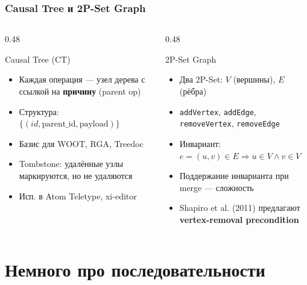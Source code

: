 \documentclass{beamer}
\begin{document}
\begin{frame}
\frametitle{Causal Tree и 2P-Set Graph}

\begin{columns}
\begin{column}{0.48\textwidth}
\begin{block}{Causal Tree (CT)}
\begin{itemize}
  \item Каждая операция — узел дерева с ссылкой на \textbf{причину} (parent op)
  \item Структура: $\{(id, \text{parent\_id}, \text{payload})\}$
  \item Базис для WOOT, RGA, Treedoc
  \item Tombstone: удалённые узлы маркируются, но не удаляются
  \item Исп. в Atom Teletype, xi-editor
\end{itemize}
\end{block}
\end{column}
\begin{column}{0.48\textwidth}
\begin{block}{2P-Set Graph}
\begin{itemize}
  \item Два 2P-Set: $V$ (вершины), $E$ (рёбра)
  \item \texttt{addVertex}, \texttt{addEdge}, \texttt{removeVertex}, \texttt{removeEdge}
  \item Инвариант: $e=(u,v) \in E \Rightarrow u \in V \land v \in V$
  \item Поддержание инварианта при merge — сложность
  \item Shapiro et al. (2011) предлагают \textbf{vertex-removal precondition}
\end{itemize}
\end{block}
\end{column}
\end{columns}

\end{frame}

\section{Немного про последовательности}
\end{document}
